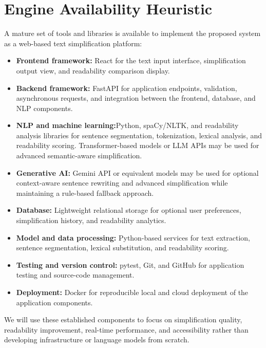\documentclass[11pt,a4paper]{article}
\begin{document}
\section{Engine Availability Heuristic}
A mature set of tools and libraries is available to implement the proposed system as a web-based text simplification platform:
\begin{itemize}[leftmargin=0.7cm]
    \item \textbf{Frontend framework:} React for the text input interface, simplification output view, and readability comparison display.
    
    \item \textbf{Backend framework:} FastAPI for application endpoints, validation, asynchronous requests, and integration between the frontend, database, and NLP components.
    
    \item \textbf{NLP and machine learning:}Python, spaCy/NLTK, and readability analysis libraries for sentence segmentation, tokenization, lexical analysis, and readability scoring. Transformer-based models or LLM APIs may be used for advanced semantic-aware simplification.
    
    \item \textbf{Generative AI:} Gemini API or equivalent models may be used for optional context-aware sentence rewriting and advanced simplification while maintaining a rule-based fallback approach.
    
    \item \textbf{Database:} Lightweight relational storage for optional user preferences, simplification history, and readability analytics.
    
    \item \textbf{Model and data processing:} Python-based services for text extraction, sentence segmentation, lexical substitution, and readability scoring.
    
    \item \textbf{Testing and version control:} pytest, Git, and GitHub for application testing and source-code management.
    
    \item \textbf{Deployment:} Docker for reproducible local and cloud deployment of the application components.
\end{itemize}
We will use these established components to focus on simplification quality, readability improvement, real-time performance, and accessibility rather than developing infrastructure or language models from scratch.
\end{document}
